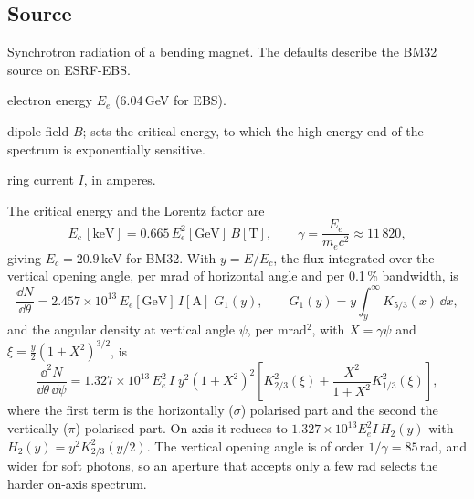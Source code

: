 
\subsection{Source}

Synchrotron radiation of a bending magnet. The defaults describe the BM32 source on ESRF-EBS.
\begin{args}
\item[ring\_energy\_gev] electron energy $E_e$ (6.04\,GeV for EBS).
\item[magnetic\_field\_t] dipole field $B$; sets the critical energy, to which the high-energy
  end of the spectrum is exponentially sensitive.
\item[current\_a] ring current $I$, in amperes.
\end{args}
 The critical energy and the Lorentz factor are
\begin{equation}
  E_c\,[\mathrm{keV}] = 0.665\,E_e^2[\mathrm{GeV}]\,B[\mathrm{T}], \qquad
  \gamma = \frac{E_e}{m_e c^2} \approx 11\,820 ,
\end{equation}
giving $E_c = 20.9$\,keV for BM32. With $y = E/E_c$, the flux integrated over the vertical
opening angle, per mrad of horizontal angle and per 0.1\,\% bandwidth, is \citep{Kim1989}
\begin{equation}
  \frac{\dd N}{\dd\theta} = 2.457\times10^{13}\,E_e[\mathrm{GeV}]\,I[\mathrm{A}]\;G_1(y),
  \qquad G_1(y) = y\int_y^\infty K_{5/3}(x)\,\dd x ,
  \label{eq:g1}
\end{equation}
and the angular density at vertical angle $\psi$, per mrad$^2$, with $X = \gamma\psi$ and
$\xi = \tfrac{y}{2}(1+X^2)^{3/2}$, is
\begin{equation}
  \frac{\dd^2 N}{\dd\theta\,\dd\psi} = 1.327\times10^{13}\,E_e^2\,I\;y^2(1+X^2)^2
  \left[K_{2/3}^2(\xi) + \frac{X^2}{1+X^2}K_{1/3}^2(\xi)\right],
  \label{eq:angular}
\end{equation}
where the first term is the horizontally ($\sigma$) polarised part and the second the
vertically ($\pi$) polarised part. On axis it reduces to $1.327\times10^{13}E_e^2 I\,H_2(y)$
with $H_2(y) = y^2K_{2/3}^2(y/2)$. The vertical opening angle is of order $1/\gamma =
85$\,\textmu rad, and wider for soft photons, so an aperture that accepts only a few
\textmu rad selects the harder on-axis spectrum.

